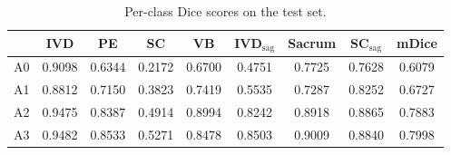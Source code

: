 \begin{table}[htbp]
\centering
\caption{Per-class Dice scores on the test set.}
\label{tab:perclass}
\begin{tabular}{lcccccccc}
\toprule
& IVD & PE & SC & VB & IVD$_\text{sag}$ & Sacrum & SC$_\text{sag}$ & mDice \\
\midrule
A0 & 0.9098 & 0.6344 & 0.2172 & 0.6700 & 0.4751 & 0.7725 & 0.7628 & 0.6079 \\
A1 & 0.8812 & 0.7150 & 0.3823 & 0.7419 & 0.5535 & 0.7287 & 0.8252 & 0.6727 \\
A2 & 0.9475 & 0.8387 & 0.4914 & 0.8994 & 0.8242 & 0.8918 & 0.8865 & 0.7883 \\
A3 & 0.9482 & 0.8533 & 0.5271 & 0.8478 & 0.8503 & 0.9009 & 0.8840 & 0.7998 \\
\bottomrule
\end{tabular}
\end{table}